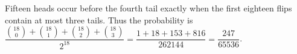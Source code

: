 Fifteen heads occur before the fourth tail exactly when the first eighteen flips contain at most three tails. Thus the probability is $\dfrac{\binom{18}{0}+\binom{18}{1}+\binom{18}{2}+\binom{18}{3}}{2^{18}}=\dfrac{1+18+153+816}{262144}=\boxed{\dfrac{247}{65536}}$.
